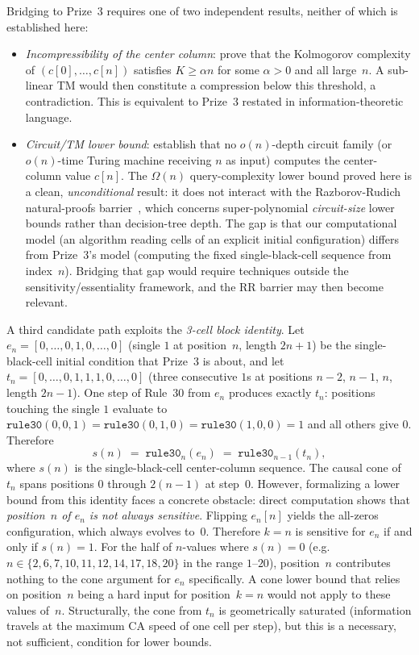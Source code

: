 \documentclass[11pt]{article}
\theoremstyle{plain}
\theoremstyle{definition}
\begin{document}
Bridging to Prize~3 requires one of two independent results, neither of which is
established here:
\begin{itemize}
  \item \emph{Incompressibility of the center column}: prove that the Kolmogorov
    complexity of $(c[0],\ldots,c[n])$ satisfies $K \geq \alpha n$ for some
    $\alpha > 0$ and all large~$n$.  A sub-linear TM would then constitute a
    compression below this threshold, a contradiction.  This is equivalent to
    Prize~3 restated in information-theoretic language.
  \item \emph{Circuit/TM lower bound}: establish that no $o(n)$-depth circuit
    family (or $o(n)$-time Turing machine receiving $n$ as input) computes the
    center-column value $c[n]$.  The $\Omega(n)$ query-complexity lower bound proved
    here is a clean, \emph{unconditional} result: it does not interact with the
    Razborov-Rudich natural-proofs barrier~\cite{RazborovRudich1997}, which concerns
    super-polynomial \emph{circuit-size} lower bounds rather than decision-tree depth.
    The gap is that our computational model (an algorithm reading cells of an explicit
    initial configuration) differs from Prize~3's model (computing the fixed
    single-black-cell sequence from index~$n$).  Bridging that gap would require
    techniques outside the sensitivity/essentiality framework, and the RR barrier may
    then become relevant.
\end{itemize}
A third candidate path exploits the \emph{3-cell block identity}.  Let
$e_n = [0,\ldots,0,1,0,\ldots,0]$ (single $1$ at position~$n$, length $2n{+}1$) be the
single-black-cell initial condition that Prize~3 is about, and let
$t_n = [0,\ldots,0,1,1,1,0,\ldots,0]$ (three consecutive $1$s at positions $n{-}2$, $n{-}1$,
$n$, length $2n{-}1$).  One step of Rule~30 from $e_n$ produces exactly $t_n$:
positions touching the single $1$ evaluate to $\mathtt{rule30}(0,0,1)=\mathtt{rule30}(0,1,0)=\mathtt{rule30}(1,0,0)=1$
and all others give $0$.  Therefore
\[
  s(n) \;=\; \mathtt{rule30}_n(e_n) \;=\; \mathtt{rule30}_{n-1}(t_n),
\]
where $s(n)$ is the single-black-cell center-column sequence.  The causal cone of $t_n$
spans positions $0$ through $2(n{-}1)$ at step~$0$.  However, formalizing a lower bound
from this identity faces a concrete obstacle: direct computation shows that
\emph{position~$n$ of $e_n$ is not always sensitive}.  Flipping $e_n[n]$ yields
the all-zeros configuration, which always evolves to~$0$.  Therefore
$k = n$ is sensitive for $e_n$ if and only if $s(n) = 1$.  For the half of $n$-values
where $s(n) = 0$ (e.g.\ $n \in \{2,6,7,10,11,12,14,17,18,20\}$ in the range $1$--$20$),
position~$n$ contributes nothing to the cone argument for $e_n$ specifically.  A cone lower bound
that relies on position~$n$ being a hard input for position~$k=n$ would not apply
to these values of~$n$.  Structurally, the cone from $t_n$ is geometrically
saturated (information travels at the maximum CA speed of one cell per step),
but this is a necessary, not sufficient, condition for lower bounds.
\end{document}
